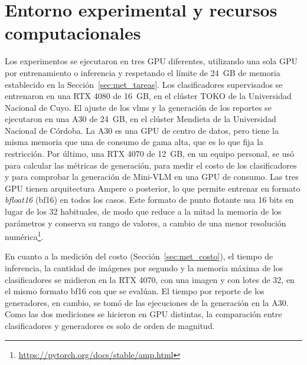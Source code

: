 \section{Entorno experimental y recursos computacionales}
\label{sec:met_entorno}

Los experimentos se ejecutaron en tres GPU diferentes, utilizando una sola GPU por entrenamiento o inferencia y respetando el límite de 24~GB de memoria establecido en la Sección~\ref{sec:met_tareas}. Los
clasificadores supervisados se entrenaron en una RTX 4080 de 16~GB, en el clúster TOKO de la Universidad Nacional de
Cuyo. El ajuste de los \glspl{vlm} y la generación de los reportes se ejecutaron en una A30 de 24~GB, en el clúster
Mendieta de la Universidad Nacional de Córdoba. La A30 es una GPU de centro de datos, pero tiene la misma memoria que una de consumo de gama alta, que es lo que fija
la restricción. Por último, una RTX 4070 de 12~GB, en un equipo personal, se usó para calcular las métricas de
generación, para medir el costo de los clasificadores y para comprobar la generación de Mini-VLM en una GPU de consumo. Las tres GPU tienen arquitectura Ampere
o posterior, lo que permite entrenar en formato \emph{bfloat16} (bf16) en todos los casos. Este formato de punto flotante usa
16 bits en lugar de los 32 habituales, de modo que reduce a la mitad la memoria de los parámetros y conserva su rango de
valores, a cambio de una menor resolución numérica\footnote{\url{https://pytorch.org/docs/stable/amp.html}}.

En cuanto a la medición del costo (Sección~\ref{sec:met_costo}), el tiempo de inferencia, la cantidad de imágenes por
segundo y la memoria máxima de los clasificadores se midieron en la RTX 4070, con una imagen y con lotes de 32, en el
mismo formato bf16 con que se evalúan. El tiempo por reporte de los
generadores, en cambio, se tomó de las ejecuciones de la generación en la A30. Como las dos mediciones se hicieron en
GPU distintas, la comparación entre clasificadores y generadores es solo de orden de magnitud.

